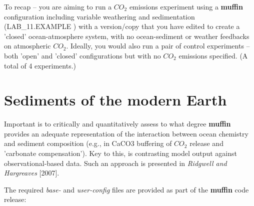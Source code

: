 \documentclass[11pt,fleqn]{book} %
\begin{document}
To recap -- you are aiming to run a \(CO_{2}\) emissions experiment using a \textbf{muffin} configuration including variable weathering and sedimentation (\textsf{\footnotesize LAB\_11.EXAMPLE }) with a version/copy that you have edited to create a 'closed' ocean-atmosphere system, with no ocean-sediment or weather feedbacks on atmospheric \(CO_{2}\). Ideally, you would also run a pair of control experiments -- both 'open' and 'closed' configurations but with no \(CO_{2}\) emissions specified. (A total of 4 experiments.)


\newpage


\section{Sediments of the modern Earth}

Important is to critically and quantitatively assess to what degree \textbf{muffin}  provides an adequate representation of the interaction between ocean chemistry and sediment composition (e.g., in CaCO3 buffering of \(CO_{2}\) release and 'carbonate compensation'). Key to this, is contrasting  model output against observational-based data. Such an approach is presented in \textit{Ridgwell and Hargreaves} [2007].

The required \textit{base-} and \textit{user-config} files are provided as part of the \textbf{muffin} code release:
\end{document}
